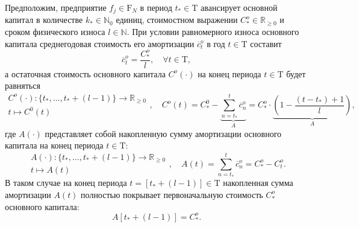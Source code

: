 Предположим, предприятие $f_{j} \in \mathrm{F}_{N}$ в период $t_{*} \in \mathrm{T}$ авансирует основной капитал в количестве $k_{*} \in \mathbb{N}_{0}$ единиц, стоимостном выражении $C^{o}_{*} \in \mathbb{R}_{\geq 0}$ и сроком физического износа $l\in \mathbb{N}$. При условии равномерного износа основного капитала среднегодовая стоимость его амортизации $\overline{c}^o_t$  в год $t \in \mathrm{T}$ составит
\begin{equation}\overline{c}^o_t = \frac{C^o_*}{l}, \quad \forall t \in \mathrm{T},\end{equation}
а остаточная стоимость основного капитала $C^{o}(\cdot)$ на конец периода $t \in \mathrm{T}$ будет равняться
\begin{equation}\begin{aligned} C^{o}(\cdot) : \{t_{*}, \dots, t_{*} +(l-1) \} \longrightarrow \mathbb{R}_{\geq 0} \\ t \longmapsto C^{0}(t) \end{aligned}, \quad C^{o}(t) = C^{0}_{*} - \underbrace{\sum_{n=t_{*}}^{t} \overline{c}^o_n}_{A} = C^{o}_{*} \cdot \underbrace{\left(1 - \frac{(t-t_{*})+1}{l} \right)}_{A},\end{equation}
где $A(\cdot)$ представляет собой накопленную сумму амортизации основного капитала на конец периода $t \in \mathrm{T}$:
$$\begin{aligned} A(\cdot) : \{t_{*}, \dots, t_{*} +(l-1) \} \longrightarrow \mathbb{R}_{\geq 0} \\ t \longmapsto A(t) \end{aligned}, \quad A(t) = \sum_{n=t_{*}}^{t} \overline{c}^o_n = C^{o}_{*} - C^{o}_{t}.$$
В таком случае на конец периода $t =[t_{*} + (l-1)] \in \mathrm{T}$ накопленная сумма амортизации $A(t)$ полностью покрывает первоначальную стоимость $C^{o}_{*}$ основного капитала:
$$A[t_{*} + (l-1)] = C^{o}_{*}.$$

